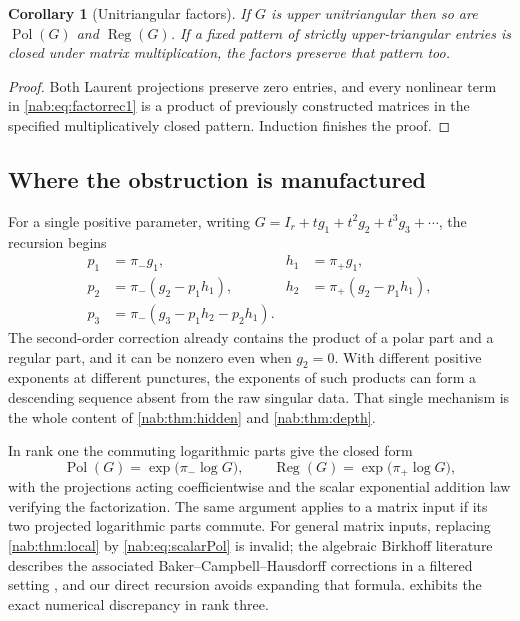 \documentclass[11pt,letterpaper]{article}
\newtheorem{corollary}[corollary]{Corollary}
\theoremstyle{definition}
\theoremstyle{remark}
\newcommand{\Pol}{\operatorname{Pol}}
\newcommand{\Reg}{\operatorname{Reg}}
\numberwithin{equation}{section}
\begin{document}
\begin{corollary}[Unitriangular factors]\label{nab:cor:unitriangular}
If $G$ is upper unitriangular then so are $\Pol(G)$ and $\Reg(G)$. If a fixed
pattern of strictly upper-triangular entries is closed under matrix
multiplication, the factors preserve that pattern too.
\end{corollary}

\begin{proof}
Both Laurent projections preserve zero entries, and every nonlinear term in
\eqref{nab:eq:factorrec1} is a product of previously constructed matrices in
the specified multiplicatively closed pattern. Induction finishes the proof.
\end{proof}

\subsection{Where the obstruction is manufactured}

For a single positive parameter, writing
$G=I_r+tg_1+t^2g_2+t^3g_3+\cdots$, the recursion begins
\begin{align*}
 p_1&=\pi_-g_1,& h_1&=\pi_+g_1,\\
 p_2&=\pi_-(g_2-p_1h_1),& h_2&=\pi_+(g_2-p_1h_1),\\
 p_3&=\pi_-(g_3-p_1h_2-p_2h_1).&&
\end{align*}
The second-order correction already contains the product of a polar part and a
regular part, and it can be nonzero even when $g_2=0$. With different positive
exponents at different punctures, the exponents of such products can form a
descending sequence absent from the raw singular data. That single mechanism is
the whole content of \cref{nab:thm:hidden} and \cref{nab:thm:depth}.

In rank one the commuting logarithmic parts give the closed form
\begin{equation}\label{nab:eq:scalarPol}
 \Pol(G)=\exp\bigl(\pi_-\log G\bigr),
 \qquad
 \Reg(G)=\exp\bigl(\pi_+\log G\bigr),
\end{equation}
with the projections acting coefficientwise and the scalar exponential
addition law verifying the factorization. The same argument applies to a
matrix input if its two projected logarithmic parts commute. For general
matrix inputs,
replacing \cref{nab:thm:local} by \eqref{nab:eq:scalarPol} is invalid; the
algebraic Birkhoff literature describes the associated
Baker--Campbell--Hausdorff corrections in a filtered setting
\cite{EFGK,EFMP}, and our direct recursion avoids expanding that formula.
 exhibits the exact numerical discrepancy in rank
three.
\end{document}
